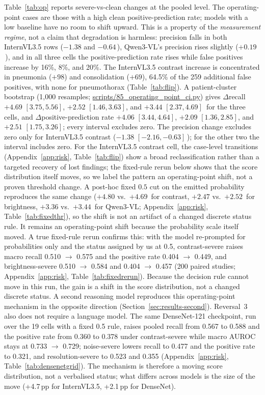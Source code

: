 Table~\ref{tab:op} reports severe-vs-clean changes at the pooled level. The operating-point cases are those with a high clean positive-prediction rate; models with a low baseline have no room to shift upward. This is a property of the \emph{measurement regime}, not a claim that degradation is harmless: precision falls in both InternVL3.5 rows ($-1.38$ and $-0.64$\,\pp{}), Qwen3-VL's precision rises slightly ($+0.19$\,\pp{}), and in all three cells the positive-prediction rate rises while false positives increase by 16\%, 8\%, and 20\%. The InternVL3.5 contrast increase is concentrated in pneumonia ($+98$) and consolidation ($+69$), 64.5\% of the 259 additional false positives, with none for pneumothorax (Table~\ref{tab:flip}). A patient-cluster bootstrap (1,000 resamples; \url{scripts/85_operating_point_ci.py}) gives $\Delta$recall $+4.69$ $[3.75,5.56]$, $+2.52$ $[1.46,3.63]$, and $+3.44$ $[2.37,4.69]$\,\pp{} for the three cells, and $\Delta$positive-prediction rate $+4.06$ $[3.44,4.64]$, $+2.09$ $[1.36,2.85]$, and $+2.51$ $[1.75,3.26]$; every interval excludes zero. The precision change excludes zero only for InternVL3.5 contrast ($-1.38$ $[-2.16,-0.63]$\,\pp{}); for the other two the interval includes zero. For the InternVL3.5 contrast cell, the case-level transitions (Appendix~\ref{app:risk}, Table~\ref{tab:flip}) show a broad reclassification rather than a targeted recovery of lost findings; the fixed-rule rerun below shows that the score distribution itself moves, so we label the pattern an operating-point shift, not a proven threshold change. A post-hoc fixed $0.5$ cut on the emitted probability reproduces the same change ($+4.80$ vs.\ $+4.69$\,\pp{} for contrast, $+2.47$ vs.\ $+2.52$\,\pp{} for brightness, $+3.36$ vs.\ $+3.44$\,\pp{} for Qwen3-VL; Appendix~\ref{app:risk}, Table~\ref{tab:fixedthr}), so the shift is not an artifact of a changed discrete status rule. It remains an operating-point shift because the probability scale itself moved. A true fixed-rule rerun confirms this: with the model re-prompted for probabilities only and the status assigned by us at 0.5, contrast-severe raises macro recall 0.510 $\rightarrow$ 0.575 and the positive rate 0.404 $\rightarrow$ 0.449, and brightness-severe 0.510 $\rightarrow$ 0.584 and 0.404 $\rightarrow$ 0.457 (200 paired studies; Appendix~\ref{app:risk}, Table~\ref{tab:fixedrerun}). Because the decision rule cannot move in this run, the gain is a shift in the score distribution, not a changed discrete status. A second reasoning model reproduces this operating-point mechanism in the opposite direction (Section~\ref{sec:results-second}). Reversal~3 also does not require a language model. The same DenseNet-121 checkpoint, run over the 19 cells with a fixed 0.5 rule, raises pooled recall from 0.567 to 0.588 and the positive rate from 0.360 to 0.378 under contrast-severe while macro AUROC stays at 0.733 $\rightarrow$ 0.729; noise-severe lowers recall to 0.477 and the positive rate to 0.321, and resolution-severe to 0.523 and 0.355 (Appendix~\ref{app:risk}, Table~\ref{tab:densenetgrid}). The mechanism is therefore a moving score distribution, not a verbalised status; what differs across models is the size of the move (+4.7\,pp for InternVL3.5, +2.1\,pp for DenseNet).

